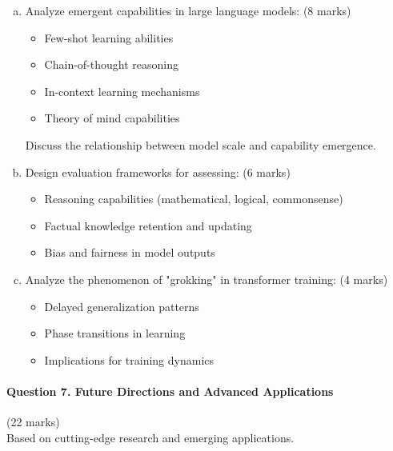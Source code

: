 \documentclass[12pt]{article}
\newcommand{\shortanswer}{\vspace{2cm}}
\newcommand{\mediumanswer}{\vspace{3cm}}
\begin{document}
\begin{enumerate}[(a)]
    \item Analyze emergent capabilities in large language models: \hfill (8 marks)
    \begin{itemize}
        \item Few-shot learning abilities
        \item Chain-of-thought reasoning
        \item In-context learning mechanisms
        \item Theory of mind capabilities
    \end{itemize}
    
    Discuss the relationship between model scale and capability emergence.
    
    \mediumanswer
    
    \item Design evaluation frameworks for assessing: \hfill (6 marks)
    \begin{itemize}
        \item Reasoning capabilities (mathematical, logical, commonsense)
        \item Factual knowledge retention and updating
        \item Bias and fairness in model outputs
    \end{itemize}
    
    \mediumanswer
    
    \item Analyze the phenomenon of "grokking" in transformer training: \hfill (4 marks)
    \begin{itemize}
        \item Delayed generalization patterns
        \item Phase transitions in learning
        \item Implications for training dynamics
    \end{itemize}
    
    \shortanswer
\end{enumerate}

\newpage
\paragraph{Question 7. Future Directions and Advanced Applications}\hfill (22 marks)\\
Based on cutting-edge research and emerging applications.
\end{document}
